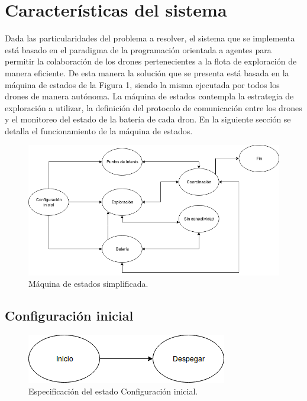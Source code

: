 \chapter{Características del sistema}

Dada las particularidades del problema a resolver, el sistema que se implementa está basado en el paradigma de la programación orientada a agentes para permitir la colaboración de los drones pertenecientes a la flota de exploración de manera eficiente. De esta manera la solución que se presenta está basada en la máquina de estados de la Figura 1, siendo la misma ejecutada por todos los drones de manera autónoma. 
La máquina de estados contempla la estrategia de exploración a utilizar, la definición del protocolo de comunicación entre los drones y el monitoreo del estado de la batería de cada dron.
En la siguiente sección se detalla el funcionamiento de la máquina de estados.

\begin{figure}[h!]
	\label{fig:comp}
	\includegraphics[width=.8\textwidth]{imagenes/chap5/image1}
	\caption{Máquina de estados simplificada.}
\end{figure}

\section{Configuración inicial}

\begin{figure}[h!]
	\label{fig:comp}
	\includegraphics[width=.8\textwidth]{imagenes/chap5/image2}
	\caption{Especificación del estado Configuración inicial.}
\end{figure}

